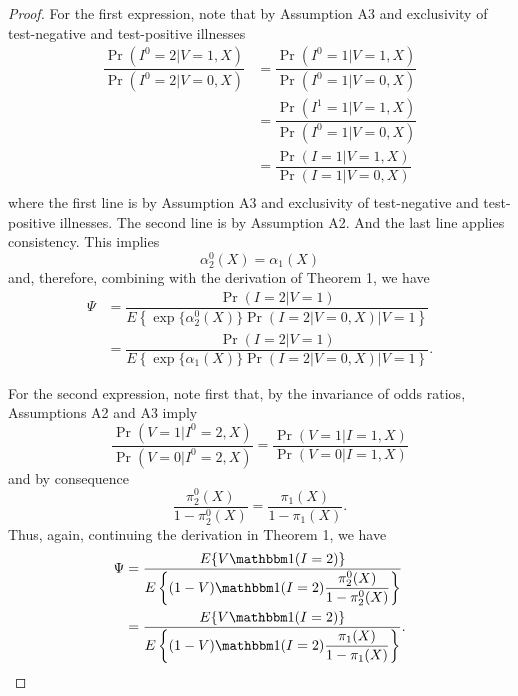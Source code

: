 \documentclass{article}
\begin{document}
\begin{proof}
For the first expression, note that by Assumption A3 and exclusivity of test-negative and test-positive illnesses
\begin{align*}
    \dfrac{\Pr(I^0 = 2 | V = 1, X)}{\Pr(I^0 = 2 | V = 0, X)} &= \dfrac{\Pr(I^0 = 1 | V = 1, X)}{\Pr(I^0 = 1 | V = 0, X)} \\
    &= \dfrac{\Pr(I^1 = 1 | V = 1, X)}{\Pr(I^0 = 1 | V = 0, X)} \\
    &= \dfrac{\Pr(I = 1 | V = 1, X)}{\Pr(I = 1 | V = 0, X)} \\
\end{align*}
where the first line is by Assumption A3 and exclusivity of test-negative and test-positive illnesses. The second line is by Assumption A2. And the last line applies consistency. This implies
\begin{equation*}
    \alpha_2^0(X) = \alpha_1(X)
\end{equation*}
and, therefore, combining with the derivation of Theorem 1, we have
\begin{align*}
    \Psi &= \dfrac{\Pr(I = 2 | V = 1)}{E\left\{ \exp\{\alpha^0_2(X)\} \Pr(I = 2 | V = 0, X) \Big| V = 1 \right\}} \\
    &= \dfrac{\Pr(I = 2 | V = 1)}{E\left\{ \exp\{\alpha_1(X)\} \Pr(I = 2 | V = 0, X) \Big| V = 1 \right\}}.
\end{align*}

For the second expression, note first that, by the invariance of odds ratios, Assumptions A2 and A3 imply
\begin{equation*}
    \dfrac{\Pr(V = 1 | I^0 = 2, X)}{\Pr(V = 0 | I^0 = 2, X)} = \dfrac{\Pr(V = 1 | I = 1, X)}{\Pr(V = 0 | I = 1, X)}
\end{equation*}
and by consequence 
\begin{equation*}
    \dfrac{\pi^0_2(X)}{1 - \pi^0_2(X)} = \dfrac{\pi_1(X)}{1 - \pi_1(X)}.
\end{equation*}
Thus, again, continuing the derivation in Theorem 1, we have 
\begin{align*}
    \Psi &= \dfrac{E\{V \mathbbm 1 (I = 2)\}}{E\left\{(1 - V)\mathbbm 1 (I = 2) \dfrac{\pi^0_2(X)}{1-\pi^0_2(X)}\right\}} \\
    &= \dfrac{E\{V \mathbbm 1 (I = 2)\}}{E\left\{(1 - V)\mathbbm 1 (I = 2) \dfrac{\pi_1(X)}{1-\pi_1(X)}\right\}}.
\end{align*}
\end{proof}
\newpage
\end{document}
